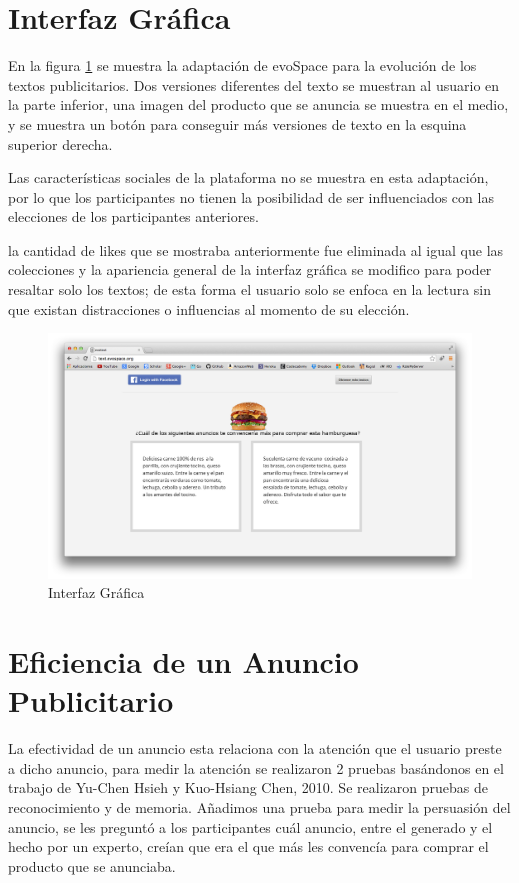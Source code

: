 \section{Interfaz Gráfica}

En la figura \ref{interfaz} se muestra la adaptación de evoSpace para la evolución de los textos publicitarios. Dos versiones diferentes del texto se muestran al usuario en la parte inferior, una imagen del producto que se anuncia se muestra en el medio, y se muestra un botón para conseguir más versiones de texto en la esquina superior derecha.

Las características sociales de la plataforma no se muestra en esta adaptación, por lo que  los participantes no tienen la posibilidad de ser influenciados con las elecciones de los participantes anteriores. 

la cantidad de likes que se mostraba anteriormente fue eliminada al igual que las colecciones y la apariencia general de la interfaz gráfica se modifico para poder resaltar solo los textos; de esta forma el usuario solo se enfoca en la lectura sin que existan distracciones o influencias al momento de su elección.
 

\begin{figure}[htp]
  \centerline{\includegraphics[width=7in]{interfaz.png}} 
  \caption{Interfaz Gráfica} 
\label{interfaz}
\end{figure}

\section{Eficiencia de un Anuncio Publicitario}

La efectividad de un anuncio esta relaciona con la atención que el usuario preste a dicho anuncio, para medir la atención se realizaron 2 pruebas basándonos en el trabajo de Yu-Chen Hsieh y Kuo-Hsiang Chen, 2010. Se realizaron pruebas de reconocimiento y de memoria. Añadimos una prueba para medir la persuasión del anuncio, se les preguntó a los participantes cuál anuncio, entre el generado y el hecho por un experto, creían que era el que más les convencía para comprar el producto que se anunciaba.
